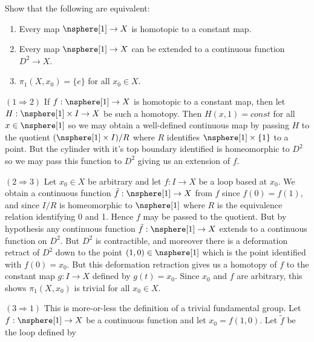\documentclass{book}                                                           %
\begin{document}
\begin{problem}
    Show that the following are equivalent:
    \begin{enumerate}
        \item Every map $\nsphere[1]\rightarrow{X}$ is homotopic to a
              constant map.
        \item Every map $\nsphere[1]\rightarrow{X}$ can be extended to a
              continuous function $D^{2}\rightarrow{X}$.
        \item $\pi_{1}(X,x_{0})=\{e\}$ for all $x_{0}\in{X}$.
    \end{enumerate}
\end{problem}
\begin{solution}
    $(1\Rightarrow{2})$ If $f:\nsphere[1]\rightarrow{X}$ is homotopic to a
    constant map, then let $H:\nsphere[1]\times{I}\rightarrow{X}$ be such a
    homotopy. Then $H(x,1)=const$ for all $x\in\nsphere[1]$ so we may obtain
    a well-defined continuous map by passing $H$ to the quotient
    $(\nsphere[1]\times{I})/R$ where $R$ identifies $\nsphere[1]\times\{1\}$
    to a point. But the cylinder with it's top boundary identified is
    homeomorphic to $D^{2}$ so we may pass this function to $D^{2}$ giving
    us an extension of $f$.
    \par\hfill\par
    $(2\Rightarrow{3})$ Let $x_{0}\in{X}$ be arbitrary and let
    $f:I\rightarrow{X}$ be a loop based at $x_{0}$. We obtain a continuous
    function $\tilde{f}:\nsphere[1]\rightarrow{X}$ from $f$ since
    $f(0)=f(1)$, and since $I/R$ is homeomorphic to $\nsphere[1]$
    where $R$ is the equivalence relation identifying 0 and 1. Hence $f$ may
    be passed to the quotient. But by hypothesis any continuous function
    $\tilde{f}:\nsphere[1]\rightarrow{X}$ extends to a continuous function
    on $D^{2}$. But $D^{2}$ is contractible, and moreover there is a
    deformation retract of $D^{2}$ down to the point $(1,0)\in\nsphere[1]$
    which is the point identified with $f(0)=x_{0}$.
    But this deformation retraction gives us a homotopy of
    $f$ to the constant map $g:I\rightarrow{X}$ defined by $g(t)=x_{0}$.
    Since $x_{0}$ and $f$ are arbitrary, this shows $\pi_{1}(X,x_{0})$ is
    trivial for all $x_{0}\in{X}$.
    \par\hfill\par
    $(3\Rightarrow{1})$ This is more-or-less the definition of a trivial
    fundamental group. Let $f:\nsphere[1]\rightarrow{X}$ be a continuous
    function and let $x_{0}=f(1,0)$. Let $\tilde{f}$ be the loop defined by

\end{solution}
\end{document}
